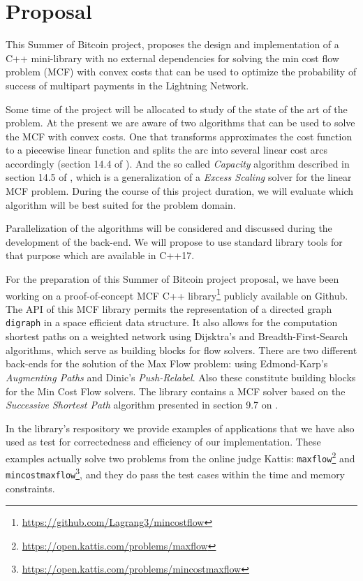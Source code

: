 \section{Proposal}

This Summer of Bitcoin project, proposes the design and implementation of a C++
mini-library with no external dependencies for solving the min cost flow problem
(MCF) with convex costs that can be used to optimize the probability of success
of multipart payments in the Lightning Network.

Some time of the project will be allocated to study of the state of the art of
the problem. At the present we are aware of two algorithms that can be used to
solve the MCF with convex costs.
One that transforms approximates the cost function to a piecewise linear
function and splits the arc into several linear cost arcs accordingly (section
14.4 of \cite{ahuja1993network}).
And the so called \emph{Capacity}
algorithm described in section 14.5 of \cite{ahuja1993network},
which is a generalization of a \emph{Excess Scaling} solver for the linear
MCF problem.
During the course of this project duration, we will evaluate which algorithm
will be best suited for the problem domain.

Parallelization of the algorithms will be considered and discussed during the
development of the back-end.
We will propose to use standard library tools for that purpose
which are available in C++17.

For the preparation of this Summer of Bitcoin project proposal, we have been
working on a proof-of-concept MCF C++ library\footnote{%
\url{https://github.com/Lagrang3/mincostflow}} publicly available on Github.
The API of this MCF library permits the representation of a directed graph
\texttt{digraph} in a space efficient data structure.
It also allows for the computation 
shortest paths on a weighted network using Dijsktra's and Breadth-First-Search
algorithms, which serve as building blocks for flow solvers.
There are two different back-ends for the solution of the Max Flow problem:
using Edmond-Karp's \emph{Augmenting Paths} and Dinic's \emph{Push-Relabel}.
Also these constitute building blocks for the Min Cost Flow solvers.
The library contains a MCF solver based on the \emph{Successive Shortest Path}
algorithm presented in section 9.7 on \cite{ahuja1993network}.

In the library's respository we provide examples of applications that we have also
used as test for correctedness and efficiency of our implementation.
These examples actually solve two problems from the online judge Kattis:
\texttt{maxflow}\footnote{\url{https://open.kattis.com/problems/maxflow}}
and
\texttt{mincostmaxflow}\footnote{\url{https://open.kattis.com/problems/mincostmaxflow}},
and they do pass the test cases within the time and memory constraints.
